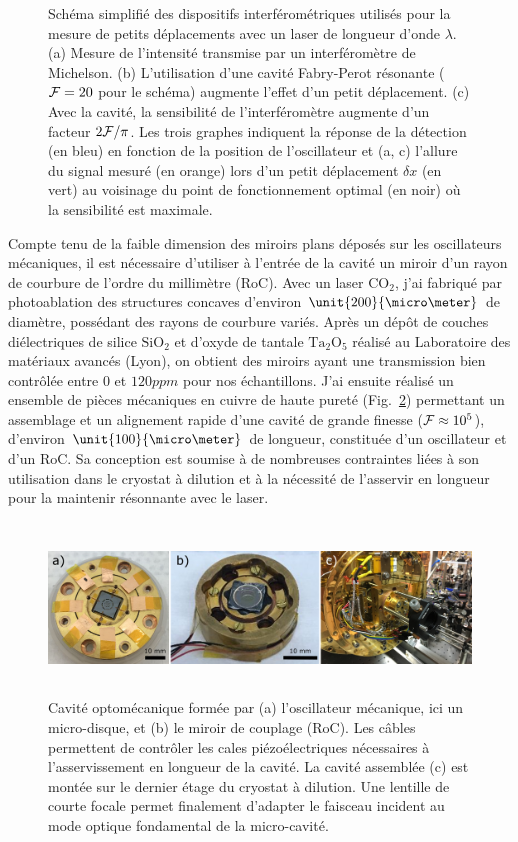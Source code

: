 \documentclass[12pt,a4paper]{article}
\newcommand{\uroc}{\micro RoC}
\begin{document}
\begin{figure}
\caption{Schéma simplifié des dispositifs interférométriques utilisés pour la mesure de petits déplacements avec un laser de longueur d'onde $\lambda$.
(a) Mesure de l'intensité transmise par un interféromètre de Michelson.
(b) L'utilisation d'une cavité Fabry-Perot résonante (${\cal{F}}=20$ pour le schéma) augmente l'effet d'un petit déplacement.
(c) Avec la cavité, la sensibilité de l'interféromètre augmente d'un facteur $2{\cal{F}}/\pi$.
Les trois graphes indiquent la réponse de la détection (en bleu) en fonction de la position de l'oscillateur et (a, c) l'allure du signal mesuré (en orange) lors d'un petit déplacement $\delta x$ (en vert) au voisinage du point de fonctionnement optimal (en noir) où la sensibilité est maximale.}
\label{fig:detection_scheme}
\end{figure}

Compte tenu de la faible dimension des miroirs plans déposés sur les oscillateurs mécaniques, il est nécessaire d'utiliser à l'entrée de la cavité un miroir d'un rayon de courbure de l'ordre du millimètre (\uroc).
Avec un laser $\mathrm{CO_2}$, j'ai fabriqué par photoablation des structures concaves d'environ $\unit{200}{\micro\meter}$ de diamètre, possédant des rayons de courbure variés.
Après un dépôt de couches diélectriques de silice $\mathrm{SiO_2}$ et d'oxyde de tantale $\mathrm{Ta_2O_5}$ réalisé au Laboratoire des matériaux avancés (Lyon), on obtient des miroirs ayant une transmission bien contrôlée entre 0 et $\unit{120}{ppm}$ pour nos échantillons.
J'ai ensuite réalisé un ensemble de pièces mécaniques en cuivre de haute pureté (Fig.~\ref{fig:cavity}) permettant un assemblage et un alignement rapide d'une cavité de grande finesse (${\cal{F}}\approx 10^5$), d'environ $\unit{100}{\micro\meter}$ de longueur, constituée d'un oscillateur et d'un \uroc.
Sa conception est soumise à de nombreuses contraintes liées à son utilisation dans le cryostat à dilution et à la nécessité de l'asservir en longueur pour la maintenir résonnante avec le laser.

\begin{figure}
\center
\includegraphics[height=129pt]{figures/optomechanical_cavity_small.png}
\caption{Cavité optomécanique formée par (a) l'oscillateur mécanique, ici un micro-disque, et (b) le miroir de couplage (\uroc).
Les câbles permettent de contrôler les cales piézoélectriques nécessaires à l'asservissement en longueur de la cavité.
La cavité assemblée (c) est montée sur le dernier étage du cryostat à dilution.
Une lentille de courte focale permet finalement d'adapter le faisceau incident au mode optique fondamental de la micro-cavité.}
\label{fig:cavity}
\end{figure}
\end{document}
